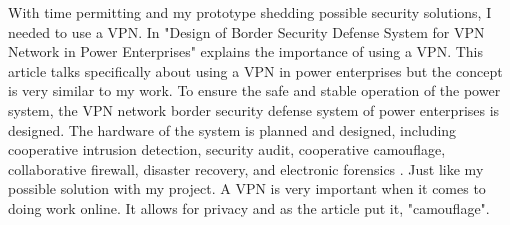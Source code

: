 With time permitting and my prototype shedding possible security solutions, I needed to use a VPN. In "Design of Border Security Defense System for VPN Network in Power Enterprises" explains the importance of using a VPN. This article talks specifically about using a VPN in power enterprises but the concept is very similar to my work. To ensure the safe and stable operation of the power system, the VPN network border security defense system of power enterprises is designed. The hardware of the system is planned and designed, including cooperative intrusion detection, security audit, cooperative camouflage, collaborative firewall, disaster recovery, and electronic forensics \cite{wenzhen2020design}.
Just like my possible solution with my project. A VPN is very important when it comes to doing work online. It allows for privacy and as the article put it, "camouflage".

